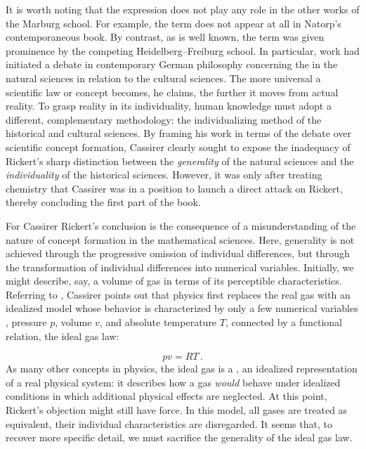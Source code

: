 \documentclass[submitted,12pt]{article}
\begin{document}
It is worth noting that the expression   does not play any role in the other works of the Marburg school. For example, the term does not appear at all in Natorp's contemporaneous \citeyear{Natorp1910a} book. By contrast, as is well known, the term was given prominence by the competing Heidelberg--Freiburg school. In particular,  work had initiated a debate in contemporary German philosophy concerning the  in the natural sciences in relation to the cultural sciences. The more universal a scientific law or concept becomes, he claims, the further it moves from actual reality. To grasp reality in its individuality, human knowledge must adopt a different, complementary methodology: the individualizing method of the historical and cultural sciences. By framing his work in terms of the debate over scientific concept formation, Cassirer clearly sought to expose the inadequacy of Rickert's sharp distinction between the \emph{generality} of the natural sciences and the \emph{individuality} of the historical sciences. However, it was only after treating chemistry that Cassirer was in a position to launch a direct attack on Rickert, thereby concluding the first part of the book.

For Cassirer Rickert's conclusion is the consequence of a misunderstanding of the nature of concept formation in the mathematical sciences. Here, generality is not achieved through the progressive omission of individual differences, but through the transformation of individual differences into numerical variables. Initially, we might describe, say, a volume of gas in terms of its perceptible characteristics. Referring to \citet{Duhem1906}, Cassirer points out that physics first replaces the real gas with an idealized model whose behavior is characterized by only a few numerical variables , pressure $p$, volume $v$, and absolute temperature $T$, connected by a functional relation, the ideal gas law:  

\begin{equation*}
pv=RT\,.  
\end{equation*}
%
As many other concepts in physics, the ideal gas is a  , an idealized representation of a real physical system: it describes how a gas \emph{would} behave under idealized conditions in which additional physical effects are neglected. At this point, Rickert's objection might still have force. In this model, all gases are treated as equivalent, their individual characteristics are disregarded. It seems that, to recover more specific detail, we must sacrifice the generality of the ideal gas law.
\end{document}
